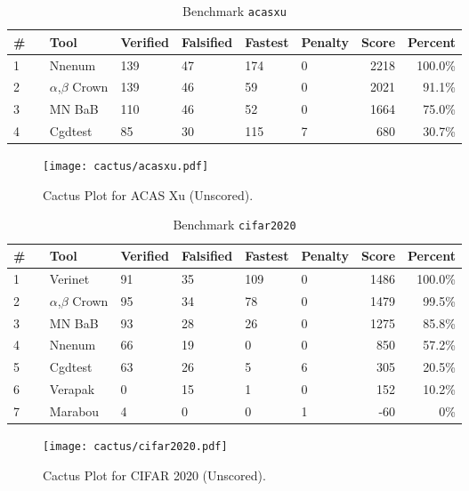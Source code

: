 

\begin{table}[h]
\begin{center}
\caption{Benchmark \texttt{acasxu}} \label{tab:cat_{cat}}
{\setlength{\tabcolsep}{2pt}
\begin{tabular}[h]{@{}llllllrr@{}}
\toprule
\textbf{\# ~} & \textbf{Tool} & \textbf{Verified} & \textbf{Falsified} & \textbf{Fastest} & \textbf{Penalty} & \textbf{Score} & \textbf{Percent}\\
\midrule
1 & Nnenum & 139 & 47 & 174 & 0 & 2218 & 100.0\% \\
2 & $\alpha$,$\beta$ Crown & 139 & 46 & 59 & 0 & 2021 & 91.1\% \\
3 & MN BaB & 110 & 46 & 52 & 0 & 1664 & 75.0\% \\
4 & Cgdtest & 85 & 30 & 115 & 7 & 680 & 30.7\% \\
\bottomrule
\end{tabular}
}
\end{center}
\end{table}



\begin{figure}[h]
\centerline{\texttt{[image: cactus/acasxu.pdf]}}
\caption{Cactus Plot for ACAS Xu (Unscored).}
\label{fig:quantPic}
\end{figure}



\begin{table}[h]
\begin{center}
\caption{Benchmark \texttt{cifar2020}} \label{tab:cat_{cat}}
{\setlength{\tabcolsep}{2pt}
\begin{tabular}[h]{@{}llllllrr@{}}
\toprule
\textbf{\# ~} & \textbf{Tool} & \textbf{Verified} & \textbf{Falsified} & \textbf{Fastest} & \textbf{Penalty} & \textbf{Score} & \textbf{Percent}\\
\midrule
1 & Verinet & 91 & 35 & 109 & 0 & 1486 & 100.0\% \\
2 & $\alpha$,$\beta$ Crown & 95 & 34 & 78 & 0 & 1479 & 99.5\% \\
3 & MN BaB & 93 & 28 & 26 & 0 & 1275 & 85.8\% \\
4 & Nnenum & 66 & 19 & 0 & 0 & 850 & 57.2\% \\
5 & Cgdtest & 63 & 26 & 5 & 6 & 305 & 20.5\% \\
6 & Verapak & 0 & 15 & 1 & 0 & 152 & 10.2\% \\
7 & Marabou & 4 & 0 & 0 & 1 & -60 & 0\% \\
\bottomrule
\end{tabular}
}
\end{center}
\end{table}



\begin{figure}[h]
\centerline{\texttt{[image: cactus/cifar2020.pdf]}}
\caption{Cactus Plot for CIFAR 2020 (Unscored).}
\label{fig:quantPic}
\end{figure}

